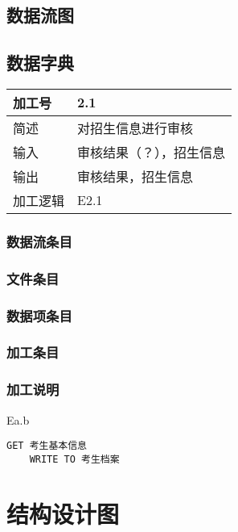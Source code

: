 \documentclass[CJK,utf8]{ctexrep}
\begin{document}
\subsection*{数据流图}

\subsection*{数据字典}

%
%
\begin{tabularx}{0.85\textwidth}{|l|X|}
	\hline
	加工号 & 2.1 \\
	\hline
	简述 & 对招生信息进行审核 \\
	\hline
	输入 & 审核结果（？），招生信息 \\
	\hline
	输出 & 审核结果，招生信息 \\
	\hline
	加工逻辑 & E2.1 \\
	\hline
\end{tabularx}
\subsubsection*{数据流条目}

\subsubsection*{文件条目}

\subsubsection*{数据项条目}

\subsubsection*{加工条目}

\subsubsection*{加工说明}

Ea.b
\begin{lstlisting}[style=proc]
	GET 考生基本信息
	WRITE TO 考生档案
\end{lstlisting}

\section*{结构设计图}
\end{document}
